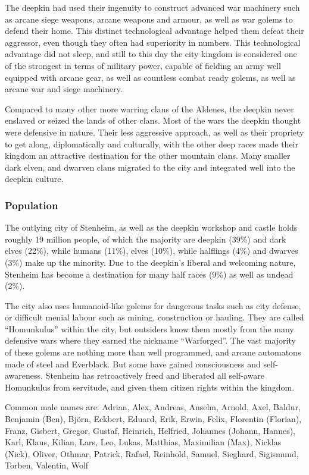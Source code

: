 The deepkin had used their ingenuity to construct advanced war machinery such
as arcane siege weapons, arcane weapons and armour, as well as war golems to
defend their home. This distinct technological advantage helped them defeat
their aggressor, even though they often had superiority in numbers.  This
technological advantage did not sleep, and still to this day the city kingdom
is considered one of the strongest in terms of military power, capable of
fielding an army well equipped with arcane gear, as well as countless combat
ready golems, as well as arcane war and siege machinery.

Compared to many other more warring clans of the Aldenes, the deepkin never
enslaved or seized the lands of other clans. Most of the wars the deepkin
thought were defensive in nature. Their less aggressive approach, as well as
their propriety to get along, diplomatically and culturally, with the other
deep races made their kingdom an attractive destination for the other mountain
clans. Many smaller dark elven, and dwarven clans migrated to the city and
integrated well into the deepkin culture.

\subsubsection{Population}

The outlying city of Stenheim, as well as the deepkin workshop and castle holds
roughly 19 million people, of which the majority are deepkin (39\%) and dark
elves (22\%), while humans (11\%), elves (10\%), while halflings (4\%) and
dwarves (3\%) make up the minority. Due to the deepkin's liberal and welcoming
nature, Stenheim has become a destination for many half races (9\%) as well as
undead (2\%).

The city also uses humanoid-like golems for dangerous tasks such as city
defense, or difficult menial labour such as mining, construction or hauling.
They are called ``Homunkulus'' within the city, but outsiders know them mostly
from the many defensive wars where they earned the nickname ``Warforged''. The
vast majority of these golems are nothing more than well programmed, and
arcane automatons made of steel and Everblack. But some have gained
consciousness and self-awareness. Stenheim has retroactively freed and
liberated all self-aware Homunkulus from servitude, and given them citizen
rights within the kingdom.

Common male names are: Adrian, Alex, Andreas, Anselm, Arnold, Axel, Baldur,
Benjamin (Ben), Björn, Eckbert, Eduard, Erik, Erwin, Felix, Florentin
(Florian), Franz, Gisbert, Gregor, Gustaf, Heinrich, Helfried, Johannes
(Johann, Hannes), Karl, Klaus, Kilian, Lars, Leo, Lukas, Matthias,
Maximilian (Max), Nicklas (Nick), Oliver, Othmar, Patrick, Rafael, Reinhold,
Samuel, Sieghard, Sigismund, Torben, Valentin, Wolf

